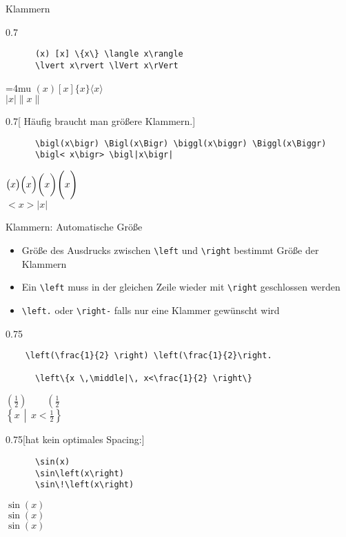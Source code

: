 \begin{frame}[fragile]{Klammern}
  \vspace{-1.5em}
  \begin{CodeExample}{0.7}
    \begin{lstlisting}
      (x) [x] \{x\} \langle x\rangle
      \lvert x\rvert \lVert x\rVert
    \end{lstlisting}
  \CodeResult
    \Umathcloseopenspacing\textstyle=4mu
    $(x) [x] \{x\} \langle x\rangle $\\
    $\lvert x\rvert \lVert x\rVert$
  \end{CodeExample}

  \begin{CodeExample}{0.7}[ Häufig braucht man größere Klammern.]
    \begin{lstlisting}
      \bigl(x\bigr) \Bigl(x\Bigr) \biggl(x\biggr) \Biggl(x\Biggr)
      \bigl< x\bigr> \bigl|x\bigr|
    \end{lstlisting}
  \CodeResult
    $\bigl(x\bigr) \Bigl(x\Bigr) \biggl(x\biggr) \Biggl(x\Biggr)$ \\
    $\bigl< x\bigr>\bigl|x\bigr|$
  \end{CodeExample}
\end{frame}

\begin{frame}[fragile]{Klammern: Automatische Größe}
  \begin{itemize}
    \item Größe des Ausdrucks zwischen \lstinline+\left+ und \lstinline+\right+ bestimmt Größe der Klammern
    \item Ein \lstinline+\left+ muss in der gleichen Zeile wieder mit \lstinline+\right+ geschlossen werden
    \item \lstinline+\left.+ oder \lstinline+\right-+ falls nur eine Klammer gewünscht wird
  \end{itemize}
  \begin{CodeExample}{0.75}
    \begin{lstlisting}
    \left(\frac{1}{2} \right) \left(\frac{1}{2}\right.

      \left\{x \,\middle|\, x<\frac{1}{2} \right\}
    \end{lstlisting}
  \CodeResult
$\left(\frac{1}{2}\right) \qquad \left(\frac{1}{2}\right.$ \\\smallskip
    $\left\{ x \, \middle| \, x < \frac{1}{2} \right\}$
  \end{CodeExample}

  \begin{CodeExample}{0.75}[hat kein optimales Spacing:]
    \begin{lstlisting}
      \sin(x)
      \sin\left(x\right)
      \sin\!\left(x\right)
    \end{lstlisting}
  \CodeResult
    $\sin(x)$ \\
    $\sin\left(x\right)$ \\
    $\sin\!\left(x\right)$
  \end{CodeExample}
\end{frame}

